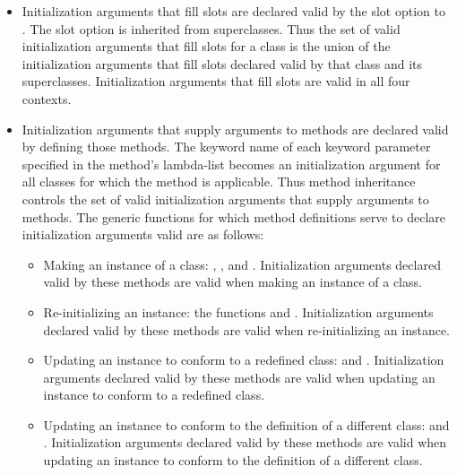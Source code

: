 \begin{itemize}

\item  Initialization arguments that fill slots are declared
valid by the  slot option to .  The 
 slot option is inherited from superclasses.  Thus the set of
valid initialization arguments that fill slots for a class is the
union of the initialization arguments that fill slots declared
valid by that class and its superclasses. Initialization arguments
that fill slots are valid in all four contexts.

\item  Initialization arguments that supply arguments to methods
are declared valid by defining those methods.  The keyword name of
each keyword parameter specified in the method's lambda-list becomes
an initialization argument for all classes for which the method is
applicable.  Thus method inheritance controls the set of valid
initialization arguments that supply arguments to methods.  The
generic functions for which method definitions serve to declare
initialization arguments valid are as follows:

\begin{itemize}
\item Making an instance of a class: ,
, and .
Initialization arguments declared valid by these methods are
valid when making an instance of a class.

\item  Re-initializing an instance: the functions 
and .
Initialization arguments declared valid by these methods are
valid when re-initializing an instance.

\item   Updating an instance to conform to a redefined class:
and .
Initialization arguments declared valid by these methods are
valid when updating an instance to conform to a redefined class.

\item  Updating an instance to conform to the definition of a
different class:  and 
.
Initialization arguments declared valid by these methods are
valid when updating an instance to conform to the definition
of a different class.
\end{itemize}
\end{itemize}

